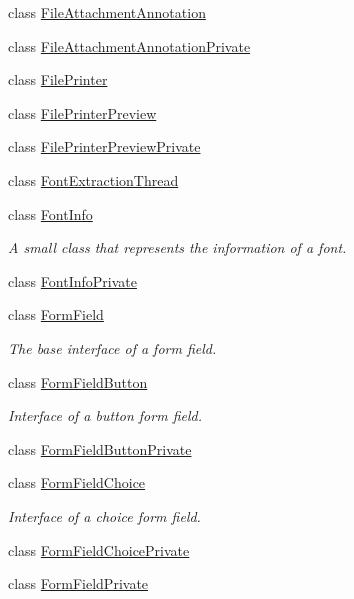 \begin{DoxyCompactItemize}
\item 
class \hyperlink{classOkular_1_1FileAttachmentAnnotation}{File\+Attachment\+Annotation}
\item 
class \hyperlink{classOkular_1_1FileAttachmentAnnotationPrivate}{File\+Attachment\+Annotation\+Private}
\item 
class \hyperlink{classOkular_1_1FilePrinter}{File\+Printer}
\item 
class \hyperlink{classOkular_1_1FilePrinterPreview}{File\+Printer\+Preview}
\item 
class \hyperlink{classOkular_1_1FilePrinterPreviewPrivate}{File\+Printer\+Preview\+Private}
\item 
class \hyperlink{classOkular_1_1FontExtractionThread}{Font\+Extraction\+Thread}
\item 
class \hyperlink{classOkular_1_1FontInfo}{Font\+Info}
\begin{DoxyCompactList}\small\item\em A small class that represents the information of a font. \end{DoxyCompactList}\item 
class \hyperlink{classOkular_1_1FontInfoPrivate}{Font\+Info\+Private}
\item 
class \hyperlink{classOkular_1_1FormField}{Form\+Field}
\begin{DoxyCompactList}\small\item\em The base interface of a form field. \end{DoxyCompactList}\item 
class \hyperlink{classOkular_1_1FormFieldButton}{Form\+Field\+Button}
\begin{DoxyCompactList}\small\item\em Interface of a button form field. \end{DoxyCompactList}\item 
class \hyperlink{classOkular_1_1FormFieldButtonPrivate}{Form\+Field\+Button\+Private}
\item 
class \hyperlink{classOkular_1_1FormFieldChoice}{Form\+Field\+Choice}
\begin{DoxyCompactList}\small\item\em Interface of a choice form field. \end{DoxyCompactList}\item 
class \hyperlink{classOkular_1_1FormFieldChoicePrivate}{Form\+Field\+Choice\+Private}
\item 
class \hyperlink{classOkular_1_1FormFieldPrivate}{Form\+Field\+Private}
\item 

\end{DoxyCompactItemize}
